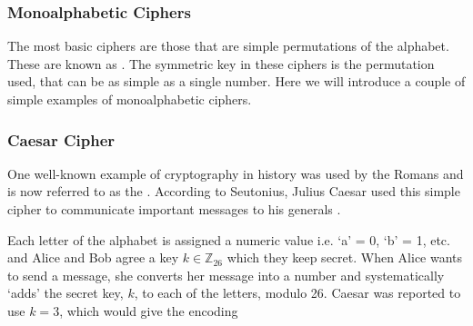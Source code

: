 

\subsubsection{Monoalphabetic Ciphers}

The most basic ciphers are those that are simple permutations of the alphabet. These are known as . The symmetric key in these ciphers is the permutation used, that can be as simple as a single number. Here we will introduce a couple of simple examples of monoalphabetic ciphers. 

\subsubsection*{Caesar Cipher}

One well-known example of cryptography in history was used by the Romans and is now referred to as the . According to Seutonius, Julius Caesar used this simple cipher to communicate important messages to his generals \cite{Suetonius}. 

Each letter of the alphabet is assigned a numeric value i.e. `a' = 0, `b' = 1, etc. and Alice and Bob agree a key $k\in\mathbb{Z}_{26}$ which they keep secret. When Alice wants to send a message, she converts her message into a number and systematically `adds' the secret key, $k$, to each of the letters, modulo 26. Caesar was reported to use $k=3$, which would give the encoding 




